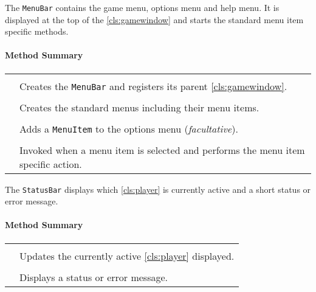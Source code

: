 The \texttt{MenuBar} contains the game menu, options menu and help menu. It is displayed at the top of the \ref{cls:gamewindow} and starts the standard menu item specific methods. \\

\centerdash

\paragraph*{Method Summary}
\paragraph*{}
\begin{longtable}{Lp{10cm}}
	\startmethodtable
	 \\
	& Creates the \texttt{MenuBar} and registers its parent \ref{cls:gamewindow}. \\
	 \\
	& Creates the standard menus including their menu items. \\ 
	 \\
	& Adds a \texttt{MenuItem} to the options menu (\emph{facultative}). \\ 
	 \\
	& Invoked when a menu item is selected and performs the menu item specific action. \\ 
	\hline
\end{longtable}
\pagebreak


The \texttt{StatusBar} displays which \ref{cls:player} is currently active and a short status or error message. \\

\centerdash

\paragraph*{Method Summary}
\paragraph*{}
\begin{longtable}{Lp{10cm}}
	\startmethodtable
	 \\
	& Updates the currently active \ref{cls:player} displayed. \\ 
	 \\
	& Displays a status or error message. \\ 
	\hline
\end{longtable}
